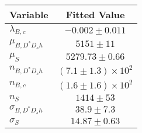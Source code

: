 \begin{tabular}[t]{lc}
\hline
Variable &Fitted Value\\
\hline\hline
$\lambda_{B,c}$&$-0.002\pm0.011$\\
\hline
$\mu_{B, D^* D_s h}$&$5151\pm11$\\
\hline
$\mu_S$&$5279.73\pm0.66$\\
\hline
$n_{B, D^* D_s h}$&$(7.1\pm1.3)\times 10^2$\\
\hline
$n_{B,c}$&$(1.6\pm1.6)\times 10^2$\\
\hline
$n_S$&$1414\pm53$\\
\hline
$\sigma_{B, D^* D_s h}$&$38.9\pm7.3$\\
\hline
$\sigma_S$&$14.87\pm0.63$\\
\hline
\end{tabular}